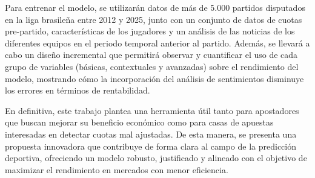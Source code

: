 Para entrenar el modelo, se utilizarán datos de más de 5.000 partidos disputados en la liga brasileña entre 2012 y 2025, junto con un conjunto de datos de cuotas pre-partido, características de los jugadores y un análisis de las noticias de los diferentes equipos en el periodo temporal anterior al partido. Además, se llevará a cabo un diseño incremental que permitirá observar y cuantificar el uso de cada grupo de variables (básicas, contextuales y avanzadas) sobre el rendimiento del modelo, mostrando cómo la incorporación del análisis de sentimientos disminuye los errores en términos de rentabilidad.

En definitiva, este trabajo plantea una herramienta útil tanto para apostadores que buscan mejorar su beneficio económico como para casas de apuestas interesadas en detectar cuotas mal ajustadas. De esta manera, se presenta una propuesta innovadora que contribuye de forma clara al campo de la predicción deportiva, ofreciendo un modelo robusto, justificado y alineado con el objetivo de maximizar el rendimiento en mercados con menor eficiencia.




